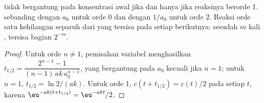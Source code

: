 \begin{proposition}\label{prop:b1:rate-laws:half-life-test}
 tidak bergantung pada konsentrasi awal jika dan hanya jika
reaksinya berorde 1.  sebanding dengan $a_0$ untuk orde 0 dan
dengan $1/a_0$ untuk orde 2. Reaksi orde satu kehilangan separuh dari yang
tersisa pada setiap  berikutnya: sesudah $m$ kali ,
tersisa bagian $2^{-m}$.
\end{proposition}

\begin{proof}
Untuk orde $n \ne 1$, pemisahan variabel menghasilkan $t_{1/2} = \dfrac{2^{n-1} -
1}{(n-1)\,ak\,a_0^{n-1}}$, yang bergantung pada $a_0$ kecuali jika $n = 1$;
untuk $n = 1$, $t_{1/2} = \ln2/(ak)$. Untuk orde 1, $c(t + t_{1/2}) = c(t)/2$
pada setiap $t$, karena $\eu^{-ak(t + t_{1/2})} = \eu^{-akt}/2$.
\end{proof}

